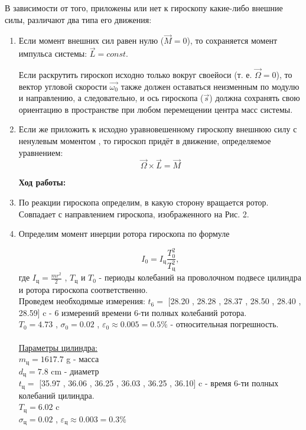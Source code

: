 \documentclass[8pt]{article}
\begin{document}
    В зависимости от того, приложены или нет к гироскопу какие-либо внешние силы, различают два типа его движения:
    \begin{enumerate}
        \item Если момент внешних сил равен нулю ($\vec{M} = 0$), то  сохраняется момент импульса системы: $\vec{L} = const$.
    
    Если раскрутить гироскоп исходно только вокруг своейоси (т. е. $\vec{\Omega} = 0$), то вектор угловой скорости $\vec{\omega_0}$ также должен оставаться неизменным по модулю и направлению, а следовательно, и ось гироскопа ($\vec{s}$) должна сохранять свою ориентацию в пространстве при любом перемещении центра масс системы.
    \item Если же приложить к исходно уравновешенному гироскопу внешнюю силу с ненулевым моментом , то гироскоп придёт в движение, определяемое уравнением:
    \begin{equation}
        \vec{\Omega} \times \vec{L} = \vec{M}    
    \end{equation}

    \textbf{Ход работы:}
        \item По реакции гироскопа определим, в какую сторону вращается ротор. Совпадает с направлением гироскопа, изображенного на Рис. 2.

        \item Определим момент инерции ротора гироскопа по формуле
    
    $$I_0 = I_\text{ц} \frac{T_0^2}{T_\text{ц}^2},$$
    где $I_\text{ц} = \frac{mr^2}{2}$ , $T_\text{ц}$ и $T_0$ - периоды колебаний на проволочном подвесе цилиндра и ротора гироскопа соответственно. \\
    Проведем необходимые измерения:
    $t_6 = $ [28.20 , 28.28 , 28.37 , 28.50 , 28.40 , 28.59] c - 6 измерений времени 6-ти полных колебаний ротора. \\
    $T_{\text{0}} = 4.73$ , $\sigma_0 = 0.02$ , $\varepsilon_0 \approx 0.005 = 0.5\%$ - относительная погрешность. \\ \\
    \underline{Параметры цилиндра:} \\
    $m_{\text{ц}} = 1617.7$ g - масса\\
    $d_{\text{ц}} = 7.8$ cm - диаметр \\
    $t_{\text{ц}} = $ [35.97 , 36.06 , 36.25 , 36.03 , 36.25 , 36.10] c  - время 6-ти полных колебаний цилиндра.\\
    $T_{\text{ц}} = 6.02$ c \\ 
    $\sigma_{\text{ц}} = 0.02$ , 
    $\varepsilon_{\text{ц}} \approx 0.003 = 0.3 \%$


\end{enumerate}
\end{document}
